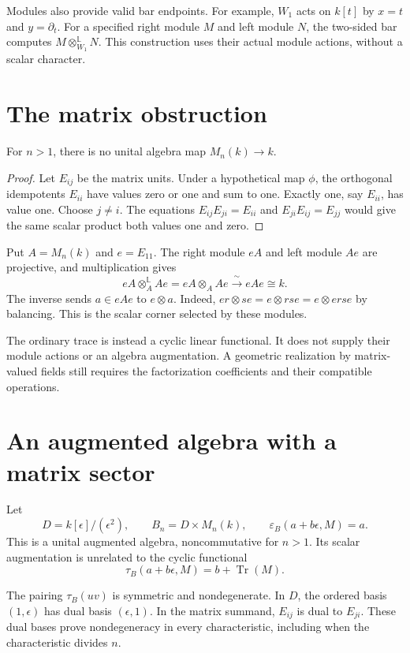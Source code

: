 Modules also provide valid bar endpoints.
For example, $W_1$ acts on $k[t]$ by $x=t$ and $y=\partial_t$.
For a specified right module $M$ and left module $N$, the two-sided bar computes $M\otimes^{\mathbb L}_{W_1}N$.
This construction uses their actual module actions, without a scalar character.

\section{The matrix obstruction}
\begin{theorem}\label{thm:matrix-noaug}
For $n>1$, there is no unital algebra map $M_n(k)\to k$.
\end{theorem}
\begin{proof}
Let $E_{ij}$ be the matrix units.
Under a hypothetical map $\phi$, the orthogonal idempotents $E_{ii}$ have values zero or one and sum to one.
Exactly one, say $E_{ii}$, has value one.
Choose $j\ne i$.
The equations $E_{ij}E_{ji}=E_{ii}$ and $E_{ji}E_{ij}=E_{jj}$ would give the same scalar product both values one and zero.
\end{proof}

Put $A=M_n(k)$ and $e=E_{11}$.
The right module $eA$ and left module $Ae$ are projective, and multiplication gives
\[
 eA\otimes_A^{\mathbb L}Ae
       =eA\otimes_A Ae\xrightarrow{\ \sim\ }eAe\cong k.
\]
The inverse sends $a\in eAe$ to $e\otimes a$.
Indeed, $er\otimes se=e\otimes rse=e\otimes erse$ by balancing.
This is the scalar corner selected by these modules.

The ordinary trace is instead a cyclic linear functional.
It does not supply their module actions or an algebra augmentation.
A geometric realization by matrix-valued fields still requires the factorization coefficients and their compatible operations.

\section{An augmented algebra with a matrix sector}
Let
\[
 D=k[\epsilon]/(\epsilon^2),\qquad B_n=D\times M_n(k),\qquad
 \varepsilon_B(a+b\epsilon,M)=a.
\]
This is a unital augmented algebra, noncommutative for $n>1$.
Its scalar augmentation is unrelated to the cyclic functional
\[
 \tau_B(a+b\epsilon,M)=b+\operatorname{Tr}(M).
\]

The pairing $\tau_B(uv)$ is symmetric and nondegenerate.
In $D$, the ordered basis $(1,\epsilon)$ has dual basis $(\epsilon,1)$.
In the matrix summand, $E_{ij}$ is dual to $E_{ji}$.
These dual bases prove nondegeneracy in every characteristic, including when the characteristic divides $n$.

